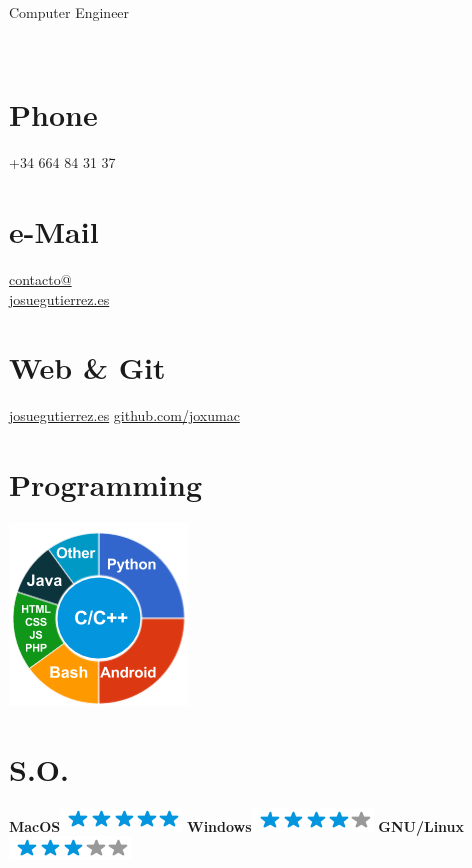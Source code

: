 \documentclass[]{friggeri-cv}
\begin{document}
      {Computer Engineer}
      

\begin{aside}
    ~
    ~
    ~
    ~
    ~
  \section{Phone}
    +34 664 84 31 37
    ~
  \section{e-Mail}
    \href{mailto:contacto@josuegutierrez.es}{contacto@\\josuegutierrez.es}
    ~
  \section{Web \& Git}
    \href{http://www.josuegutierrez.es}{josuegutierrez.es}
    \href{https://github.com/JoxuMac}{github.com/joxumac}
    ~
  \section{Programming}
    \includegraphics[scale=0.62]{img/programming.png}
    ~
  \section{S.O.}
    \textbf{MacOS}\includegraphics[scale=0.40]{img/5stars.png}
    \textbf{Windows}\includegraphics[scale=0.40]{img/4stars.png}
    \textbf{GNU/Linux}\includegraphics[scale=0.40]{img/3stars.png}
    ~

\end{aside}
\end{document}
